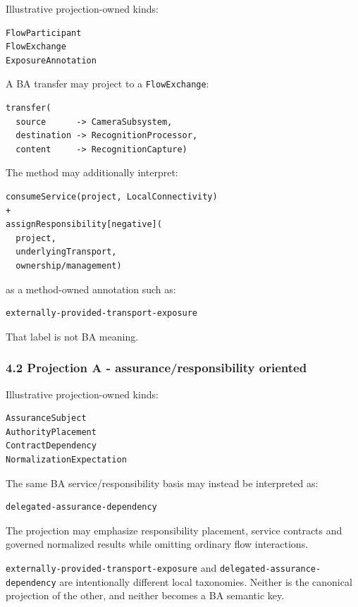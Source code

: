 \documentclass[11pt,a4paper]{article}
\begin{document}
Illustrative projection-owned kinds:

\begin{verbatim}
FlowParticipant
FlowExchange
ExposureAnnotation
\end{verbatim}

A BA transfer may project to a \texttt{FlowExchange}:

\begin{verbatim}
transfer(
  source      -> CameraSubsystem,
  destination -> RecognitionProcessor,
  content     -> RecognitionCapture)
\end{verbatim}

The method may additionally interpret:

\begin{verbatim}
consumeService(project, LocalConnectivity)
+
assignResponsibility[negative](
  project,
  underlyingTransport,
  ownership/management)
\end{verbatim}

as a method-owned annotation such as:

\begin{verbatim}
externally-provided-transport-exposure
\end{verbatim}

That label is not BA meaning.

\subsubsection{4.2 Projection A - assurance/responsibility
oriented}\label{42-projection-a---assuranceresponsibility-oriented}

Illustrative projection-owned kinds:

\begin{verbatim}
AssuranceSubject
AuthorityPlacement
ContractDependency
NormalizationExpectation
\end{verbatim}

The same BA service/responsibility basis may instead be interpreted as:

\begin{verbatim}
delegated-assurance-dependency
\end{verbatim}

The projection may emphasize responsibility placement, service contracts
and governed normalized results while omitting ordinary flow
interactions.

\texttt{externally-provided-transport-exposure} and
\texttt{delegated-assurance-dependency} are intentionally different
local taxonomies. Neither is the canonical projection of the other, and
neither becomes a BA semantic key.
\end{document}

